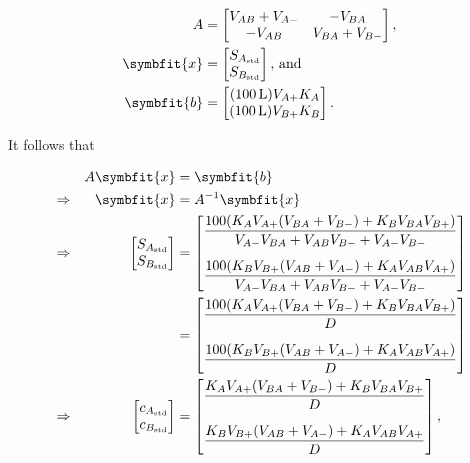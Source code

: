\begin{align*}
  A &= \begin{bmatrix}
        V_{AB} + V_{A-} & -V_{BA} \\
        -V_{AB} & V_{BA} + V_{B-}
       \end{bmatrix}, \\
  \symbfit{x} &= \begin{bmatrix}
              S_{A_{\text{std}}} \\
              S_{B_{\text{std}}}
            \end{bmatrix},\,\text{and} \\
  \symbfit{b} &= \begin{bmatrix}
              (100\,\text{L})V_{A+} K_A \\
              (100\,\text{L})V_{B+} K_B
            \end{bmatrix}.
\end{align*}

It follows that

\begin{align}
  &&A\symbfit{x} &= \symbfit{b} \\
  &\Rightarrow& \symbfit{x} &= A^{-1}\symbfit{x} \\
  &\Rightarrow& \begin{bmatrix}
              S_{A_{\text{std}}} \\
              S_{B_{\text{std}}}
            \end{bmatrix}                  &= \begin{bmatrix}
                          \dfrac{100(K_AV_{A+}(V_{BA}+V_{B-}) + K_BV_{BA}V_{B+})}{V_{A-}V_{BA} + V_{AB}V_{B-} + V_{A-}V_{B-}} \\[0.5cm]
                          \dfrac{100(K_BV_{B+}(V_{AB}+V_{A-}) + K_AV_{AB}V_{A+})}{V_{A-}V_{BA} + V_{AB}V_{B-} + V_{A-}V_{B-}}
                        \end{bmatrix} \\
                        &&&= \begin{bmatrix}
                          \dfrac{100(K_AV_{A+}(V_{BA}+V_{B-}) + K_BV_{BA}V_{B+})}{D} \\[0.5cm]
                          \dfrac{100(K_BV_{B+}(V_{AB}+V_{A-}) + K_AV_{AB}V_{A+})}{D}
                        \end{bmatrix} \\
   &\Rightarrow& \begin{bmatrix}
              c_{A_{\text{std}}} \\
              c_{B_{\text{std}}}
            \end{bmatrix} &= \begin{bmatrix}
                          \dfrac{K_AV_{A+}(V_{BA}+V_{B-}) + K_BV_{BA}V_{B+}}{D} \\[0.5cm]
                          \dfrac{K_BV_{B+}(V_{AB}+V_{A-}) + K_AV_{AB}V_{A+}}{D}
                        \end{bmatrix}, \\
\end{align}

